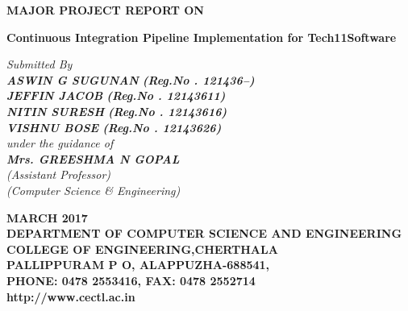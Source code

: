 \documentclass[12pt,a4paper,oneside]{report}
\begin{document}
\renewcommand\bibname{References}
\begin{titlepage}
\begin{center}
\Large{\textbf{MAJOR PROJECT REPORT ON}}\\
\vspace{.2 in}
\begin{singlespace}
\LARGE{\textbf{Continuous Integration Pipeline Implementation for Tech11Software }}\\
\end{singlespace}
\vspace{.2 in}
\Large{\textit{Submitted By }}\\
\Large{\textit{\textbf{ASWIN G SUGUNAN }\textbf{(Reg.No . 121436--)}}} \\
\Large{\textit{\textbf{JEFFIN JACOB  }\textbf{(Reg.No . 12143611)}}} \\
\Large{\textit{\textbf{NITIN SURESH }\textbf{(Reg.No . 12143616)}}} \\
\Large{\textit{\textbf{VISHNU BOSE }\textbf{(Reg.No . 12143626)}}} \\
\Large{\textit{\textit{under the guidance of}}}\\
\Large{\textit{\textbf{Mrs. GREESHMA N GOPAL}}}\\
\Large{\textit{(Assistant Professor)}}\\
\Large{\textit{(Computer Science \& Engineering)}}
\vspace{.05in}
\begin{figure}[h]
\begin{center}
\end{center}
\end{figure}
\begin{singlespace}
\large{\textbf{MARCH 2017}}\\
\vspace{.1in}
\large{\textbf{DEPARTMENT OF COMPUTER SCIENCE AND ENGINEERING\\COLLEGE OF ENGINEERING,CHERTHALA\\ PALLIPPURAM P O, ALAPPUZHA-688541, \\PHONE: 0478 2553416, FAX: 0478 2552714\\http://www.cectl.ac.in}}
\end{singlespace}
\end{center}
\end{titlepage}
\end{document}
